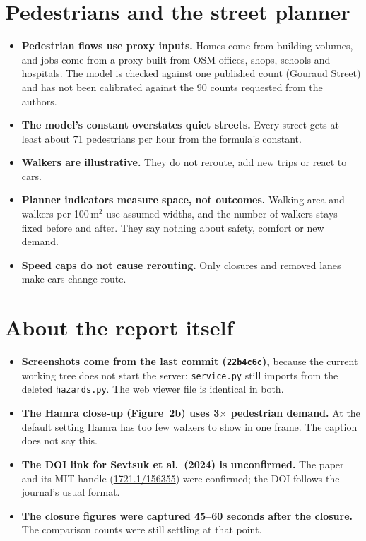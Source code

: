 \documentclass[10pt,a4paper]{article}
\begin{document}
\section{Pedestrians and the street planner}
\begin{itemize}
\item \textbf{Pedestrian flows use proxy inputs.} Homes come from building volumes, and jobs come from a proxy built from OSM offices, shops, schools and hospitals. The model is checked against one published count (Gouraud Street) and has not been calibrated against the 90 counts requested from the authors.
\item \textbf{The model's constant overstates quiet streets.} Every street gets at least about 71 pedestrians per hour from the formula's constant.
\item \textbf{Walkers are illustrative.} They do not reroute, add new trips or react to cars.
\item \textbf{Planner indicators measure space, not outcomes.} Walking area and walkers per 100\,m$^2$ use assumed widths, and the number of walkers stays fixed before and after. They say nothing about safety, comfort or new demand.
\item \textbf{Speed caps do not cause rerouting.} Only closures and removed lanes make cars change route.
\end{itemize}

\section{About the report itself}
\begin{itemize}
\item \textbf{Screenshots come from the last commit (\texttt{22b4c6c}),} because the current working tree does not start the server: \texttt{service.py} still imports from the deleted \texttt{hazards.py}. The web viewer file is identical in both.
\item \textbf{The Hamra close-up (Figure~2b) uses 3$\times$ pedestrian demand.} At the default setting Hamra has too few walkers to show in one frame. The caption does not say this.
\item \textbf{The DOI link for Sevtsuk et al.\ (2024) is unconfirmed.} The paper and its MIT handle (\href{https://hdl.handle.net/1721.1/156355}{1721.1/156355}) were confirmed; the DOI follows the journal's usual format.
\item \textbf{The closure figures were captured 45--60 seconds after the closure.} The comparison counts were still settling at that point.
\end{itemize}
\end{document}
